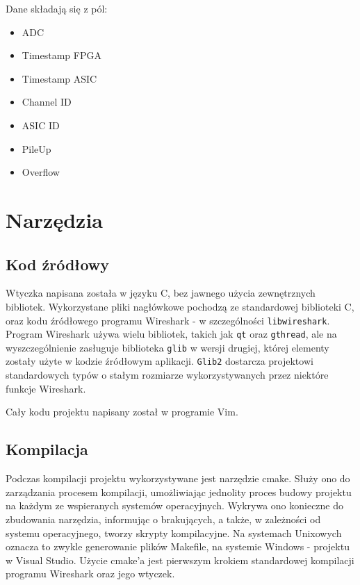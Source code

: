 \documentclass[a4paper, 12pt, twoside, openright]{article}
\begin{document}
	Dane składają się z pól:
	\begin{itemize}
		\item ADC
		\item Timestamp FPGA
		\item Timestamp ASIC
		\item Channel ID
		\item ASIC ID
		\item PileUp
		\item Overflow
	\end{itemize}



\newpage
\section{Narzędzia}
\subsection{Kod źródłowy}

	\indent\par
	Wtyczka napisana została w języku C, bez jawnego użycia zewnętrznych bibliotek. Wykorzystane pliki nagłówkowe
	pochodzą ze standardowej biblioteki C, oraz kodu źródłowego programu Wireshark - w szczególności \texttt{libwireshark}.
	Program Wireshark używa wielu bibliotek, takich jak \texttt{qt} oraz \texttt{gthread}, ale na wyszczególnienie zasługuje biblioteka
	\texttt{glib} w wersji drugiej, której
	elementy zostały użyte w kodzie źródłowym aplikacji. \texttt{Glib2} dostarcza projektowi standardowych typów o stałym
	rozmiarze wykorzystywanych przez niektóre funkcje Wireshark.
	
	Cały kodu projektu napisany został w programie Vim.

\subsection{Kompilacja}

	\indent\par
	Podczas kompilacji projektu wykorzystywane jest narzędzie cmake. Służy ono do zarządzania procesem kompilacji,
	umożliwiając jednolity proces budowy projektu
	na każdym ze wspieranych systemów operacyjnych. Wykrywa ono konieczne do zbudowania narzędzia, informując
	o brakujących, a także, w zależności od systemu operacyjnego, tworzy skrypty kompilacyjne. Na systemach Unixowych
	oznacza to zwykle generowanie plików Makefile, na systemie Windows - projektu w Visual Studio. Użycie cmake'a
	jest pierwszym krokiem standardowej kompilacji programu Wireshark oraz jego wtyczek.
	
\end{document}
